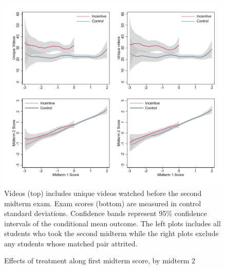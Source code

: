 \documentclass[12pt]{article}
\begin{document}
\clearpage
\begin{figure}[t]
\begin{center}
\caption{Effects of treatment along first midterm score, by midterm 2}
\label{locallin_mid2}
\includegraphics[width=1\textwidth, angle=0]{../plots/lpolymid2.pdf}
\footnotesize Videos (top) includes unique videos watched before the second midterm exam. Exam scores (bottom) are measured in control standard deviations. Confidence bands represent 95\% confidence intervals of the conditional mean outcome. The left plots includes all students who took the second midterm while the right plots exclude any students whose matched pair attrited.
\end{center}
\end{figure}
\end{document}
